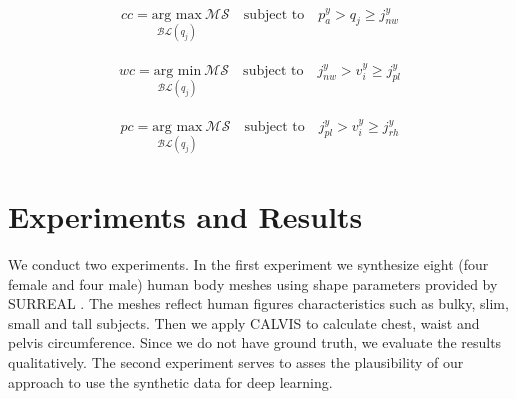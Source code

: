 \documentclass[runningheads, orivec]{llncs}
\begin{document}
\begin{align}\label{eq:cc}
cc = \underset{\mathcal{BL}(q_j)}{\text{arg max}}\ \mathcal{MS} \quad 
\text{subject 
to} \quad p^y_a > q_j \geq j^y_{nw}
\end{align}

\begin{align}\label{eq:wc}
wc = \underset{\mathcal{BL}(q_j)}{\text{arg min}}\ \mathcal{MS} \quad 
\text{subject 
	to} \quad j^y_{nw} > v^y_i \geq j^y_{pl}
\end{align}

\begin{align}\label{eq:pc}
pc = \underset{\mathcal{BL}(q_j)}{\text{arg max}}\ \mathcal{MS} \quad 
\text{subject 
	to} \quad j^y_{pl} > v^y_i \geq j^y_{rh}
\end{align}

\section{Experiments and Results}

We conduct two experiments. In the first experiment we synthesize eight (four 
female and four male) human body meshes using shape parameters provided by 
SURREAL \cite{varol17_surreal}.
The meshes reflect human figures characteristics such as bulky, slim, small and 
tall subjects. Then we apply CALVIS to calculate chest, waist and pelvis 
circumference. Since we do not have ground truth, we evaluate the results 
qualitatively.
The second 
experiment serves to asses the plausibility of our approach to use the 
synthetic data for deep learning.
\end{document}
